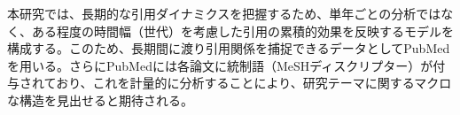 本研究では、長期的な引用ダイナミクスを把握するため、単年ごとの分析ではなく、ある程度の時間幅（世代）を考慮した引用の累積的効果を反映するモデルを構成する。このため、長期間に渡り引用関係を捕捉できるデータとしてPubMedを用いる。さらにPubMedには各論文に統制語（MeSHディスクリプター）が付与されており、これを計量的に分析することにより、研究テーマに関するマクロな構造を見出せると期待される。
